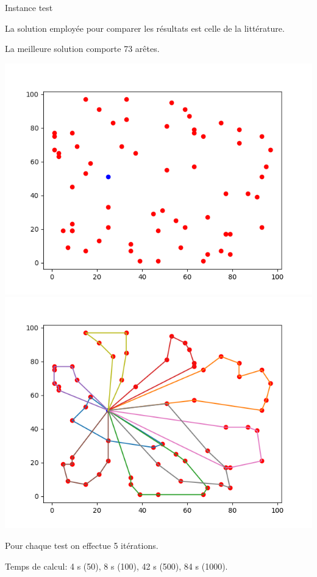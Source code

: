 \documentclass{beamer}
\begin{document}
\begin{frame}{Instance test}

La solution employée pour comparer les résultats est celle de la littérature.

La meilleure solution comporte 73 arêtes.

\includegraphics[scale=0.3]{Instance6509.png}
\includegraphics[scale=0.3]{Solution6509.png}

Pour chaque test on effectue 5 itérations.

Temps de calcul: 4 s (50), 8 s (100), 42 s (500), 84 s (1000).
\end{frame}
\end{document}

